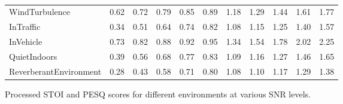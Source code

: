 \documentclass[logo,bsc,singlespacing,parskip,online]{infthesis}
\begin{document}
\begin{table}[h]
\begin{subtable}{\textwidth}
\begin{tabular}{l|ccccc|ccccc}
       WindTurbulence & \small{0.62} & \small{0.72} & \small{0.79} & \small{0.85} & \small{0.89} & \small{1.18} & \small{1.29} & \small{1.44} & \small{1.61} & \small{1.77} \\
       InTraffic & \small{0.34} & \small{0.51} & \small{0.64} & \small{0.74} & \small{0.82} & \small{1.08} & \small{1.15} & \small{1.25} & \small{1.40} & \small{1.57} \\
       InVehicle & \small{0.73} & \small{0.82} & \small{0.88} & \small{0.92} & \small{0.95} & \small{1.34} & \small{1.54} & \small{1.78} & \small{2.02} & \small{2.25} \\
       QuietIndoors & \small{0.39} & \small{0.56} & \small{0.68} & \small{0.77} & \small{0.83} & \small{1.09} & \small{1.16} & \small{1.27} & \small{1.46} & \small{1.65} \\
       ReverberantEnvironment & \small{0.28} & \small{0.43} & \small{0.58} & \small{0.71} & \small{0.80} & \small{1.08} & \small{1.10} & \small{1.17} & \small{1.29} & \small{1.38} \\
       \bottomrule
    \end{tabular}
    \caption{Processed STOI and PESQ scores for different environments at various SNR levels.}
    \label{tab:hear-ds-processed}
    \end{subtable}
    \caption{}
\end{table}
\end{document}
